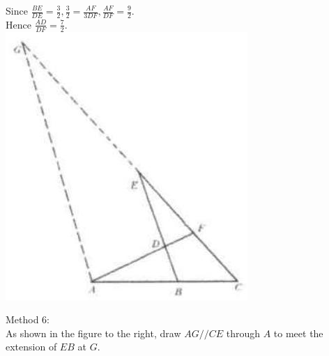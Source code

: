 \documentclass[10pt]{article}
\begin{document}
Since \(\frac{B E}{D E}=\frac{3}{2}, \frac{3}{2}=\frac{A F}{3 D F}, \frac{A F}{D F}=\frac{9}{2}\).\\
Hence \(\frac{A D}{D F}=\frac{7}{2}\).\\
\includegraphics[max width=\textwidth, center]{2025_04_17_97bc1f7e44d93c271a88g-113}

Method 6:\\
As shown in the figure to the right, draw \(A G / / C E\) through \(A\) to meet the extension of \(E B\) at \(G\).
\end{document}
